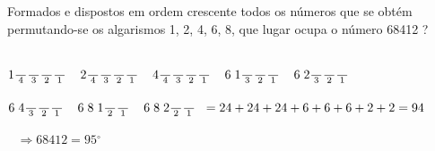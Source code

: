 \begin{ex}
 Formados e dispostos em ordem crescente todos os números que se obtém permutando-se os algarismos 1, 2, 4, 6, 8, que lugar ocupa o número 68412 ?
  \begin{sol}
      \phantom{A} \\
  $ 1 \frac{\phantom{10}}{4} \frac{\phantom{10}}{3} \frac{\phantom{10}}{2} \frac{\phantom{10}}{1}\hspace{0,4cm}   2 \frac{\phantom{10}}{4} \frac{\phantom{10}}{3} \frac{\phantom{10}}{2} \frac{\phantom{10}}{1}\hspace{0,4cm}   4 \frac{\phantom{10}}{4} \frac{\phantom{10}}{3} \frac{\phantom{10}}{2} \frac{\phantom{10}}{1}\hspace{0,4cm}   6\hspace{0,1cm} 1 \frac{\phantom{10}}{3} \frac{\phantom{10}}{2} \frac{\phantom{10}}{1}\hspace{0,4cm}  6\hspace{0,1cm} 2  \frac{\phantom{10}}{3} \frac{\phantom{10}}{2} \frac{\phantom{10}}{1}$ \\
  \\
  \phantom{A}
  $6\hspace{0,1cm} 4 \frac{\phantom{10}}{3} \frac{\phantom{10}}{2} \frac{\phantom{10}}{1}\hspace{0,4cm}  
  6\hspace{0,1cm} 8\hspace{0,1cm} 1  \frac{\phantom{10}}{2} \frac{\phantom{10}}{1}\hspace{0,4cm} 6\hspace{0,1cm} 8\hspace{0,1cm}2 \frac{\phantom{10}}{2} \frac{\phantom{10}}{1}\hspace{0,2cm} = 24+24+24+6+6+6+2+2 = 94$\\
  \\
  $\phantom{A} \Rightarrow 68412= 95{^\circ}$
  \end{sol}
  \end{ex}